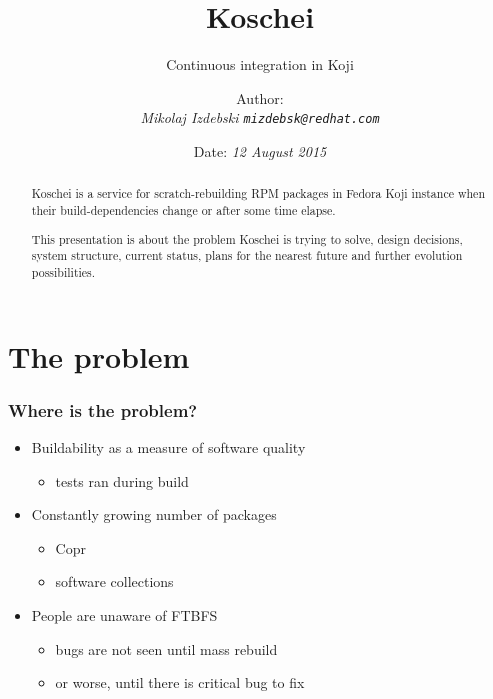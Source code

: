 \documentclass[pdftex,unicode,xcolor=table]{beamer}
\title{Koschei}
\subtitle{Continuous integration in Koji}
\author{Author: \\
  \em{Mikolaj Izdebski}
  \tt{mizdebsk@redhat.com}}
\date{Date: \em{12 August 2015}}
\begin{document}
\begin{rhbg}
  \begin{frame}
    \titlepage
    \begin{abstract}
Koschei is a service for scratch-rebuilding RPM packages in Fedora Koji
instance when their build-dependencies change or after some time elapse.

This presentation is about the problem Koschei is trying to solve, design decisions,
system structure, current status, plans for the nearest future and further
evolution possibilities.
    \end{abstract}
  \end{frame}
\end{rhbg}


\section{The problem}
\Large
\begin{frame}
  \frametitle{Where is the problem?}
  \begin{itemize}
  \item Buildability as a measure of software quality
    \begin{itemize}
      \item tests ran during build
    \end{itemize}
  \item Constantly growing number of packages
    \begin{itemize}
      \item Copr
      \item software collections
    \end{itemize}
  \item People are unaware of FTBFS
    \begin{itemize}
      \item bugs are not seen until mass rebuild
      \item or worse, until there is critical bug to fix
    \end{itemize}
  \end{itemize}
\end{frame}
\end{document}
